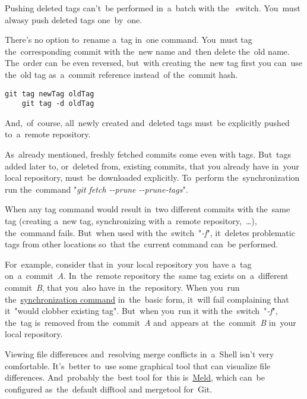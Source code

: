 \note Pushing deleted tags can't~be performed in~a~batch with the~ switch. You~must alwasy push deleted tags one~by~one.

There's no option to~rename a~tag in~one command. You~must tag the~corresponding commit with the~new name and~then delete the~old name. The~order can~be even reversed, but~with creating the~new tag first you can~use the~old tag as~a~commit reference instead~of the~commit hash.

\begin{lstlisting}[frame=no]
    git tag newTag oldTag
    git tag -d oldTag
\end{lstlisting}

\noindent And,~of~course, all~newly created and~deleted tags must~be explicitly pushed to~a~remote repository.

\label{gittagsynchronization}
As~already mentioned, freshly fetched commits come even with tags. But~tags added later to, or~deleted from, existing commits, that you already have in~your local repository, must~be downloaded explicitly. To~perform the~synchronization run the~command "\textit{git fetch \mbox{-{}-prune} \mbox{-{}-prune-tags}}".

When any tag command would result in~two different commits with the~same tag (creating a~new tag, synchronizing with a~remote repository,~\dots), the~command fails. But~when used with the~switch~"\textit{-f}", it~deletes problematic tags from other locations so~that the~current command can~be performed.

For~example, consider that in~your local repository you~have a~tag on~a~commit~\textit{A}. In~the~remote repository the~same tag exists on~a~different commit~\textit{B}, that you~also have in~the~repository. When you~run the~\hyperref[gittagsynchronization]{synchronization command} in~the~basic form, it~will fail complaining that it~"would clobber existing tag". But~when you~run it with the~switch~"\textit{-f}", the~tag is~removed from the~commit~\textit{A} and~appears at~the~commit~\textit{B} in~your local repository.

Viewing file differences and~resolving merge conflicts in~a~Shell isn't very comfortable. It's~better to~use some graphical tool that can visualize file differences. And~probably the~best tool for~this is~\href{https://meldmerge.org/}{Meld}, which can~be configured as~the~default difftool and mergetool for~Git.

